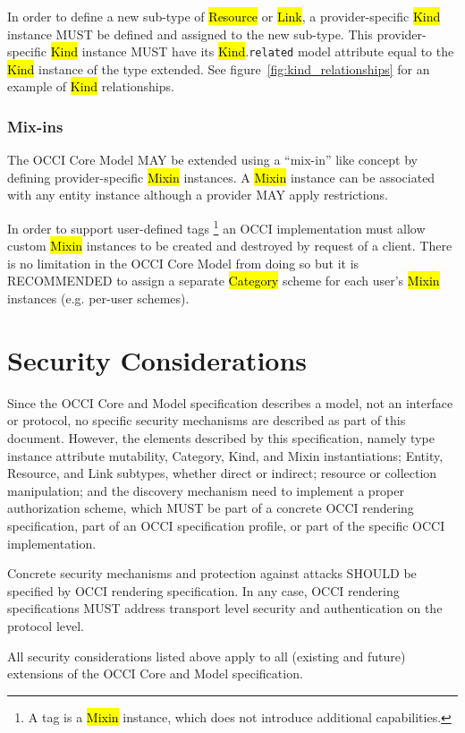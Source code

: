 \documentclass[10pt,a4paper]{article}
\begin{document}
In order to define a new sub-type of \hl{Resource} or \hl{Link}, a
provider-specific \hl{Kind} instance MUST be defined and assigned to
the new sub-type.
This provider-specific \hl{Kind} instance MUST have its \hl{Kind}.{\tt related}
model attribute equal to the \hl{Kind} instance of the type extended.
See figure~\ref{fig:kind_relationships} for an example of \hl{Kind}
relationships.

\subsubsection{Mix-ins}
The OCCI Core Model MAY be extended using a ``mix-in'' like concept by
defining provider-specific \hl{Mixin} instances.  A \hl{Mixin}
instance can be associated with any entity instance although a
provider MAY apply restrictions.

In order to support user-defined tags%
\footnote{A tag is a \hl{Mixin} instance, which does not introduce
  additional capabilities.}
an OCCI implementation must allow custom \hl{Mixin}
instances to be created and destroyed by request of a client.  There
is no limitation in the OCCI Core Model from doing so but it is
RECOMMENDED to assign a separate \hl{Category} scheme for each user's
\hl{Mixin} instances (e.g. per-user schemes).

\section{Security Considerations}
Since the OCCI Core and Model specification describes a model, not an interface
or protocol, no specific security mechanisms are described as part of this
document. However, the elements described by this specification, namely type
instance attribute mutability, Category, Kind, and Mixin instantiations; Entity,
Resource, and Link subtypes,  whether direct or indirect; resource or
collection manipulation; and the discovery mechanism need to implement a proper
authorization scheme, which MUST be part of a concrete OCCI rendering
specification, part of an OCCI specification profile, or part of the specific
OCCI implementation.

Concrete security mechanisms and protection against attacks SHOULD be specified
by OCCI rendering specification. In any case, OCCI rendering specifications MUST
address transport level security and authentication on the protocol level.

All security considerations listed above apply to all (existing and future)
extensions of the OCCI Core and Model specification.
\end{document}
